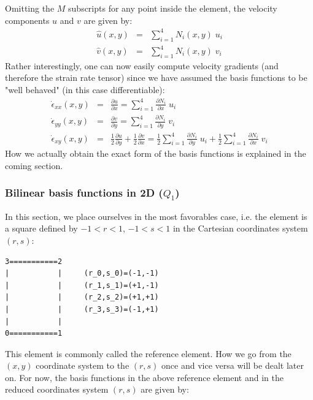 Omitting the $M$ subscripts for any point inside the element, the velocity components $u$
and $v$ are given by:
\begin{eqnarray}
\hat{u}(x,y) &=& \sum_{i=1}^4 N_i(x,y)\;  u_i \\
\hat{v}(x,y) &=& \sum_{i=1}^4 N_i(x,y)\;  v_i \label{bf01}
\end{eqnarray}
Rather interestingly, one can now easily compute velocity gradients (and therefore the 
strain rate tensor) since we have assumed the basis functions to be "well behaved" 
(in this case differentiable):
\begin{eqnarray}
\dot{\epsilon}_{xx}(x,y) &=& \frac{\partial u}{\partial x} = \sum_{i=1}^4 \frac{\partial N_i}{\partial x}\;  u_i \\
\dot{\epsilon}_{yy}(x,y) &=& \frac{\partial v}{\partial y} = \sum_{i=1}^4 \frac{\partial N_i}{\partial y}\;  v_i \\
\dot{\epsilon}_{xy}(x,y) &=& \frac{1}{2}\frac{\partial u}{\partial y} 
+ \frac{1}{2}\frac{\partial v}{\partial x} 
= \frac{1}{2}\sum_{i=1}^4 \frac{\partial N_i}{\partial y}\;  u_i
+ \frac{1}{2}\sum_{i=1}^4 \frac{\partial N_i}{\partial x}\;  v_i
\end{eqnarray}
How we actually obtain the exact form of the basis functions is explained in the coming section.










\subsubsection{Bilinear basis functions in 2D ($Q_1$)}

In this section, we place ourselves in the most favorables case, i.e. the element is a square defined 
by $-1<r<1$, $-1<s<1$ in the Cartesian coordinates system $(r,s)$:

\begin{verbatim}
3===========2       
|           |     (r_0,s_0)=(-1,-1)
|           |     (r_1,s_1)=(+1,-1)
|           |     (r_2,s_2)=(+1,+1)
|           |     (r_3,s_3)=(-1,+1)
|           |
0===========1
\end{verbatim}


This element is commonly called the reference element. How we go from the $(x,y)$ coordinate system 
to the $(r,s)$ once and vice versa will be dealt later on.
For now, the basis functions in the above reference element and in the reduced 
coordinates system $(r,s)$ are given by:


